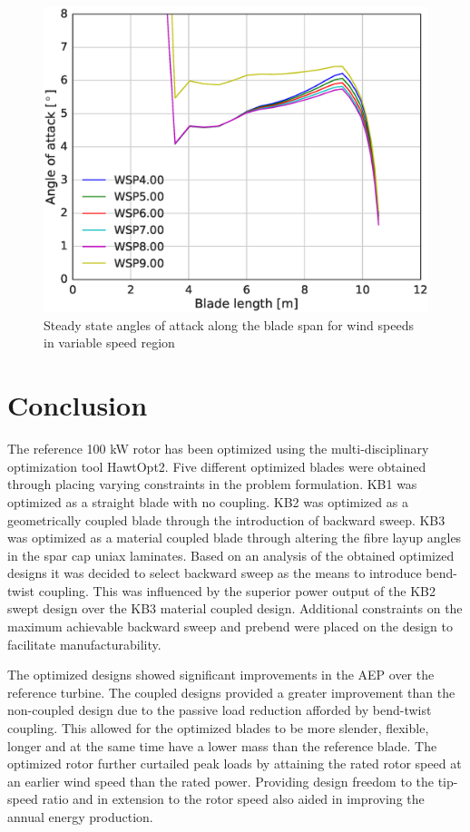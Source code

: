 
\begin{figure}[tph]
\centering
\includegraphics[width=0.8\linewidth]{figures/KB6_final/KB5_AoA_WSP_HS2.eps}
\caption{Steady state angles of attack along the blade span for wind speeds in variable speed region}
\label{fig:KB5_aoa}
\end{figure}

\section{Conclusion}
\label{sec:optimize_conc}
The reference 100 kW rotor has been optimized using the multi-disciplinary optimization tool HawtOpt2. Five different optimized blades were obtained through placing varying constraints in the problem formulation. KB1 was optimized as a straight blade with no coupling. KB2 was optimized as a geometrically coupled blade through the introduction of backward sweep. KB3 was optimized as a material coupled blade through altering the fibre layup angles in the spar cap uniax laminates. Based on an analysis of the obtained optimized designs it was decided to select backward sweep as the means to introduce bend-twist coupling. This was influenced by the superior power output of the KB2 swept design over the KB3 material coupled design. Additional constraints on the maximum achievable backward sweep and prebend were placed on the design to facilitate manufacturability.  

The optimized designs showed significant improvements in the AEP over the reference turbine. The coupled designs provided a greater improvement than the non-coupled design due to the passive load reduction afforded by bend-twist coupling. This allowed for the optimized blades to be more slender, flexible, longer and at the same time have a lower mass than the reference blade. The optimized rotor further curtailed peak loads by attaining the rated rotor speed at an earlier wind speed than the rated power. Providing design freedom to the tip-speed ratio and in extension to the rotor speed also aided in improving the annual energy production.

